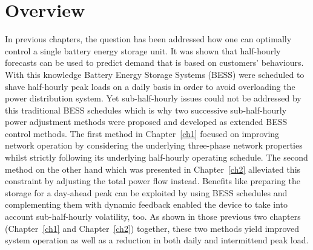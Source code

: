 \section{Overview}
\label{ch3:sec:overview}

In previous chapters, the question has been addressed how one can optimally control a single battery energy storage unit.
It was shown that half-hourly forecasts can be used to predict demand that is based on customers' behaviours.
With this knowledge Battery Energy Storage Systems (BESS) were scheduled to shave half-hourly peak loads on a daily basis in order to avoid overloading the power distribution system.
Yet sub-half-hourly issues could not be addressed by this traditional BESS schedules which is why two successive sub-half-hourly power adjustment methods were proposed and developed as extended BESS control methods.
The first method in Chapter~\ref{ch1} focused on improving network operation by considering the underlying three-phase network properties whilst strictly following its underlying half-hourly operating schedule.
The second method on the other hand which was presented in Chapter~\ref{ch2} alleviated this constraint by adjusting the total power flow instead.
Benefits like preparing the storage for a day-ahead peak can be exploited by using BESS schedules and complementing them with dynamic feedback enabled the device to take into account sub-half-hourly volatility, too.
As shown in those previous two chapters (Chapter~\ref{ch1} and Chapter~\ref{ch2}) together, these two methods yield improved system operation as well as a reduction in both daily and intermittend peak load.

